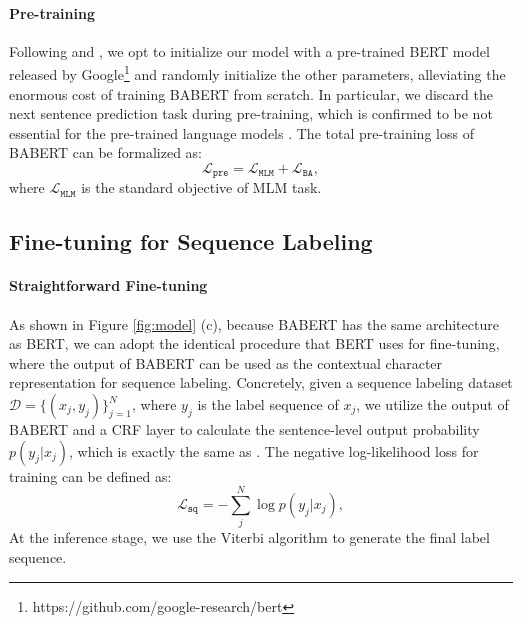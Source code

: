 \documentclass[11pt]{article}
\begin{document}
\begin{CJK}{UTF8}{gbsn}
\paragraph{Pre-training}
Following \citet{jia-etal-2020-entity} and \citet{gao-callan-2021-condenser},
we opt to initialize our model with a pre-trained BERT model released by Google\footnote{https://github.com/google-research/bert}
and randomly initialize the other parameters,
alleviating the enormous cost of training BABERT from scratch.
In particular, we discard the next sentence prediction task during pre-training, which is confirmed to be not essential for the pre-trained language models \cite{lan2019albert, liu2019roberta}.
The total pre-training loss of BABERT can be formalized as:
\begin{equation}
  \mathcal{L}_\texttt{pre} = \mathcal{L}_\texttt{MLM} + \mathcal{L}_\texttt{BA},
\end{equation}
where $\mathcal{L}_\texttt{MLM}$ is the standard objective of MLM task.

\subsection{Fine-tuning for Sequence Labeling}
\paragraph{Straightforward Fine-tuning}
As shown in Figure \ref{fig:model} (c), because BABERT has the same architecture as BERT,
we can adopt the identical procedure that BERT uses for fine-tuning, where the output of BABERT can be used as the contextual character representation for sequence labeling.
Concretely, given a sequence labeling dataset $\mathcal{D} = \{ (x_j, y_j) \}_{j=1}^N$,
where $y_j$ is the label sequence of $x_j$,
we utilize the output of BABERT and a CRF layer to calculate the sentence-level output probability $p(y_j|x_j)$,
which is exactly the same as \citet{liu-etal-2021-lexicon}.
The negative log-likelihood loss for training can be defined as:
\begin{equation}
  \label{eq:finetune}
\mathcal{L}_\texttt{sq} = - {\sum}_j^N \log p(y_j| x_j),
\end{equation}
At the inference stage, we use the Viterbi algorithm \cite{viterbi1967error} to generate the final label sequence. 


\end{CJK}
\end{document}
